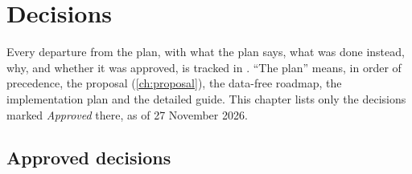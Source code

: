 \chapter{Decisions}\label{ch:decisions}

Every departure from the plan, with what the plan says, what was done instead, why, and whether it
was approved, is tracked in . ``The plan'' means,
in order of precedence, the proposal (\cref{ch:proposal}), the data-free roadmap, the implementation
plan and the detailed guide. This chapter lists only the decisions marked \emph{Approved} there,
as of 27 November 2026.

\section{Approved decisions}

